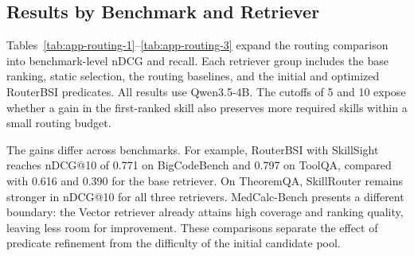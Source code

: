 \subsection{Results by Benchmark and Retriever}
\label{app:routing-results}
Tables~\ref{tab:app-routing-1}--\ref{tab:app-routing-3} expand the routing comparison into benchmark-level nDCG and recall. Each retriever group includes the base ranking, static selection, the routing baselines, and the initial and optimized RouterBSI predicates. All results use Qwen3.5-4B. The cutoffs of 5 and 10 expose whether a gain in the first-ranked skill also preserves more required skills within a small routing budget.

The gains differ across benchmarks. For example, RouterBSI with SkillSight reaches nDCG@10 of 0.771 on BigCodeBench and 0.797 on ToolQA, compared with 0.616 and 0.390 for the base retriever. On TheoremQA, SkillRouter remains stronger in nDCG@10 for all three retrievers. MedCalc-Bench presents a different boundary: the Vector retriever already attains high coverage and ranking quality, leaving less room for improvement. These comparisons separate the effect of predicate refinement from the difficulty of the initial candidate pool.




